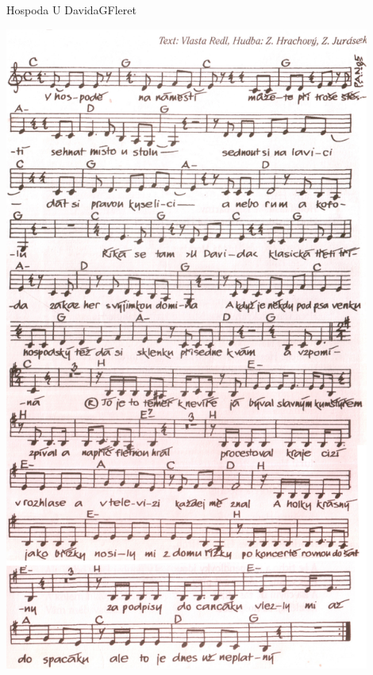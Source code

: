 \setcounter{page}{28}
\begin{song}{Hospoda U Davida}{G}{Fleret}
\begin{center}
\includegraphics[width=0.9\textwidth]{noty/a_hospoda-u-davida}
\end{center}
\end{song}
\pagebreak
